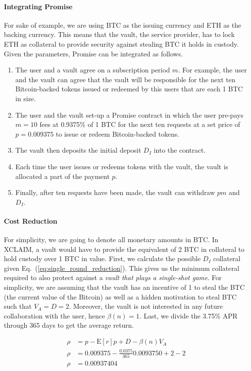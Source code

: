 \documentclass[runningheads]{llncs}
\newcommand{\sys}{Promise\xspace}
\begin{document}
\paragraph{Integrating Promise}
For sake of example, we are using BTC as the issuing currency and ETH as the backing currency.
This means that the vault, the service provider, has to lock ETH as collateral to provide security against stealing BTC it holds in custody.
Given the parameters, \sys can be integrated as follows.
\begin{enumerate}
    \item The user and a vault agree on a subscription period $m$. For example, the user and the vault can agree that the vault will be responsible for the next ten Bitcoin-backed tokens issued or redeemed by this users that are each 1 BTC in size.
    \item The user and the vault set-up a \sys contract in which the user pre-pays $m=10$ fees at 0.9375\% of 1 BTC for the next ten requests at a set price of $p=0.009375$ to issue or redeem Bitcoin-backed tokens.
    \item The vault then deposits the initial deposit $D_I$ into the contract.
    \item Each time the user issues or redeems tokens with the vault, the vault is allocated a part of the payment $p$.
    \item Finally, after ten requests have been made, the vault can withdraw $pm$ and $D_I$.
\end{enumerate}

\paragraph{Cost Reduction}
For simplicity, we are going to denote all monetary amounts in BTC.
In XCLAIM, a vault would have to provide the equivalent of 2 BTC in collateral to hold custody over 1 BTC in value.
First, we calculate the possible $D_I$ collateral given Eq.~(\ref{eq:single_round_reduction}).
This gives us the minimum collateral required to also protect against a \textit{vault that plays a single-shot game}.
For simplicity, we are assuming that the vault has an incentive of 1 to steal the BTC (the current value of the Bitcoin) as well as a hidden motivation to steal BTC such that $V_A = D = 2$.
Moreover, the vault is not interested in any future collaboration with the user, hence $\beta(n) = 1$.
Last, we divide the 3.75\% APR through 365 days to get the average return.

\begin{equation}
\label{eq:xclaim_single}
\begin{split}
    \rho &= p - \mathrm{E}[r]p + D - \beta(n) V_A\\
    \rho &= 0.009375 - \frac{0.0375}{365} 0.0093750 + 2 - 2\\
    \rho &= 0.00937404
\end{split}
\end{equation}
\end{document}
